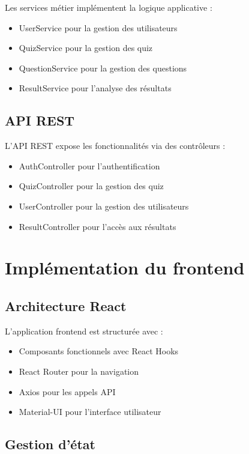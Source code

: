 \documentclass[12pt,a4paper]{report}
\begin{document}
Les services métier implémentent la logique applicative :

\begin{itemize}
    \item UserService pour la gestion des utilisateurs
    \item QuizService pour la gestion des quiz
    \item QuestionService pour la gestion des questions
    \item ResultService pour l'analyse des résultats
\end{itemize}

\subsection{API REST}

L'API REST expose les fonctionnalités via des contrôleurs :

\begin{itemize}
    \item AuthController pour l'authentification
    \item QuizController pour la gestion des quiz
    \item UserController pour la gestion des utilisateurs
    \item ResultController pour l'accès aux résultats
\end{itemize}

\section{Implémentation du frontend}

\subsection{Architecture React}

L'application frontend est structurée avec :

\begin{itemize}
    \item Composants fonctionnels avec React Hooks
    \item React Router pour la navigation
    \item Axios pour les appels API
    \item Material-UI pour l'interface utilisateur
\end{itemize}

\subsection{Gestion d'état}
\end{document}
